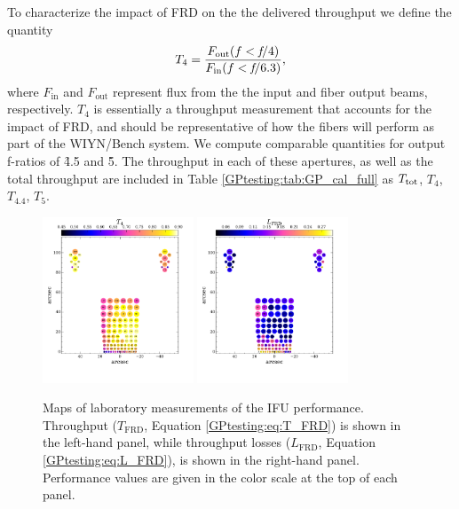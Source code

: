 To characterize the impact of FRD on the the delivered throughput we
define the quantity
\begin{equation}
\label{GPtesting:eq:T_FRD}
  T_{\mathrm{4}} = \frac{F_{\mathrm{out}}(f<\emph{f}/4)}{F_{\mathrm{in}}(f<\emph{f}/6.3)},
\end{equation}
where $F_\mathrm{in}$ and $F_\mathrm{out}$ represent flux from the the
input and fiber output beams, respectively. $T_4$ is essentially a
throughput measurement that accounts for the impact of FRD, and should
be representative of how the fibers will perform as part of the
WIYN/Bench system.  We compute comparable quantities for output
f-ratios of \f4.5 and \f5.  The throughput in each of these apertures,
as well as the total throughput are included in Table
\ref{GPtesting:tab:GP_cal_full} as $T_{\rm tot}$, $T_4$, $T_{4.4}$,
$T_{5}$.

\begin{figure}[htb]
  \centering
  \includegraphics[width=0.4\textwidth]{Appendix/figs/gradpak_map.pdf}
  \includegraphics[width=0.4\textwidth]{Appendix/figs/gradpak_L_map.pdf}
\vskip -0.25in
\caption[\GP throughput and and FRD
losses]{\label{GPtesting:fig:TL_FRD}\fixspacing Maps of laboratory
  measurements of the \GP IFU performance. Throughput
  ($T_{\mathrm{FRD}}$, Equation \ref{GPtesting:eq:T_FRD}) is shown in
  the left-hand panel, while throughput losses ($L_{\mathrm{FRD}}$,
  Equation \ref{GPtesting:eq:L_FRD}), is shown in the right-hand
  panel. Performance values are given in the color scale at the top of
  each panel.}
\end{figure}

